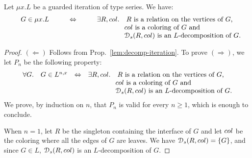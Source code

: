 \begin{proposition}\label{prop:decomp-iteration-series} Let  $\mu x. L$ be a guarded iteration of type series. We have:
$$\begin{array}{rll}
 \quad G\in \mu x. L&  \qquad\Leftrightarrow \qquad& \exists R, \col.\quad  R \text{ is a relation on the vertices of $G$,}\\
 					&           & \qquad\qquad \text{$\col$ is a coloring of $G$ and}\\
                      &             & \qquad\qquad \cD_\mathsf{s}(R,\col) \text{ is an $L$-decomposition of $G$.} 
\end{array}
$$
\end{proposition}

\begin{proof} 
$(\Leftarrow)$ Follows from Prop.~\ref{lem:decomp-iteration}. To prove  $(\Rightarrow)$, we let $P_n$ be the following property:
$$\begin{array}{rll}
 \forall G. \quad G\in L^{n,x}& \Leftrightarrow& \exists R, \col.\quad  R \text{ is a relation on the vertices of $G$,}\\
 					&           & \qquad\qquad \text{$\col$ is a coloring of $G$ and}\\
                      &             & \qquad\qquad \cD_\mathsf{s}(R,\col) \text{ is an $L$-decomposition of $G$.} 
\end{array}
$$
We prove, by induction on $n$, that $P_n$ is valid for every $n\geq 1$, which  is enough to conclude. 
\medskip

 When $n=1$, let $R$ be the singleton containing the interface of $G$ and let $\col$ be the coloring where all the edges of $G$ are leaves. We have $\cD_\mathsf{s}(R,\col)=\set{G}$, and since $G\in L$,   $\cD_\mathsf{s}(R,\col)$ is an $L$-decomposition of $G$.
\medskip


\end{proof}
